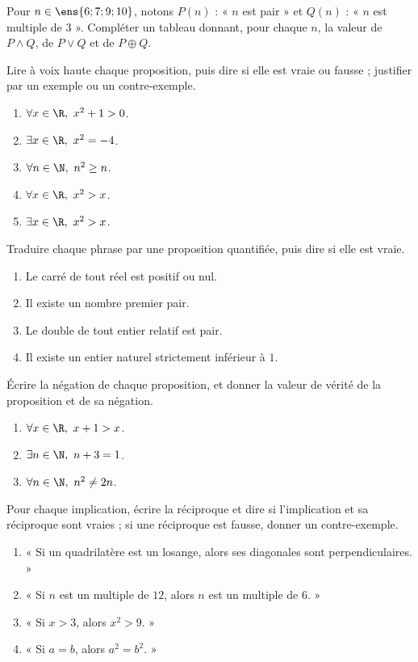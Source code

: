 \begin{exercise}[ET, OU, OU exclusif]
Pour $n\in\ens{6;7;9;10}$, notons $P(n)$ : « $n$ est pair » et $Q(n)$ : « $n$ est multiple de $3$ ». Compléter un tableau donnant, pour chaque $n$, la valeur de $P\land Q$, de $P\lor Q$ et de $P\oplus Q$.
\end{exercise}
\begin{exercise}
Lire à voix haute chaque proposition, puis dire si elle est vraie ou fausse ; justifier par un exemple ou un contre-exemple.
\begin{enumerate}
\item $\forall x\in\R,\ x^2+1>0$.
\item $\exists x\in\R,\ x^2=-4$.
\item $\forall n\in\N,\ n^2\ge n$.
\item $\forall x\in\R,\ x^2>x$.
\item $\exists x\in\R,\ x^2>x$.
\end{enumerate}
\end{exercise}
\begin{exercise}
Traduire chaque phrase par une proposition quantifiée, puis dire si elle est vraie.
\begin{enumerate}
\item Le carré de tout réel est positif ou nul.
\item Il existe un nombre premier pair.
\item Le double de tout entier relatif est pair.
\item Il existe un entier naturel strictement inférieur à $1$.
\end{enumerate}
\end{exercise}
\begin{exercise}
Écrire la négation de chaque proposition, et donner la valeur de vérité de la proposition et de sa négation.
\begin{enumerate}
\item $\forall x\in\R,\ x+1>x$.
\item $\exists n\in\N,\ n+3=1$.
\item $\forall n\in\N,\ n^2\ne2n$.
\end{enumerate}
\end{exercise}
\begin{exercise}[Réciproques]
Pour chaque implication, écrire la réciproque et dire si l'implication et sa réciproque sont vraies ; si une réciproque est fausse, donner un contre-exemple.
\begin{enumerate}
\item « Si un quadrilatère est un losange, alors ses diagonales sont perpendiculaires. »
\item « Si $n$ est un multiple de $12$, alors $n$ est un multiple de $6$. »
\item « Si $x>3$, alors $x^2>9$. »
\item « Si $a=b$, alors $a^2=b^2$. »
\end{enumerate}
\end{exercise}
